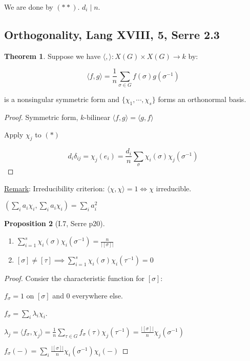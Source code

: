 \documentclass{article}
\theoremstyle{definition}
\newtheorem{theorem}{Theorem}
\newtheorem{proposition}[theorem]{Proposition}
\begin{document}
We are done by \((\ast\ast)\). \(d_i\mid n\). 

\subsection*{Orthogonality, Lang XVIII, 5, Serre 2.3}

\begin{theorem}
    Suppose we have \(\langle , \rangle : X(G) \times X(G) \to k\) by:

    \[
        \langle f,g \rangle = \frac{1}{n}\sum_{\sigma \in G} f(\sigma) g (\sigma ^{-1})
    \]

    is a nonsingular symmetric form and \(\{ \chi_1, \cdots , \chi_s \}\) forms an orthonormal basis.
\end{theorem}

\begin{proof}
    Symmetric form, \(k\)-bilinear \(\langle f,g \rangle = \langle g,f \rangle \) 

    Apply \(\chi_j\) to \((\ast)\)
    
    \[
        d_i \delta_{ij} = \chi_j(e_i) = \frac{d_i}{n} \sum_{\sigma} \chi_i(\sigma) \chi_j(\sigma ^{-1})
    \]
\end{proof}

\underline{Remark}: Irreducibility criterion: \(\langle \chi , \chi  \rangle = 1 \iff \chi\) irreducible.

\((\sum_{i} a_i \chi_i, \sum_{i} a_i \chi_i) = \sum_{i} a_i^2\) 


\begin{proposition}
    [I.7, Serre p20]

    \begin{enumerate}[label=\alph*)]
        \item \(\sum_{i=1}^{s} \chi_i (\sigma) \chi_i(\sigma^{-1}) = \frac{n}{\vert [\sigma] \vert } \)
        \item \([\sigma] \neq [\tau] \implies \sum_{i=1}^s \chi_i(\sigma) \chi_i(\tau ^{-1}) = 0 \)   
    \end{enumerate} 
\end{proposition}

\begin{proof}
    Consier the characteristic function for \([\sigma]\):

    \(f_\sigma = 1\) on \([\sigma]\) and \(0\) everywhere else. 

    \(f_\sigma = \sum_{i} \lambda_i \chi_i\).

    \(\lambda_j = \langle f_\sigma, \chi_j \rangle = \frac{1}{n} \sum_{\tau \in G} f_\sigma (\tau) \chi_j (\tau ^{-1}) = \frac{\vert [\sigma] \vert}{n} \chi_j (\sigma ^{-1})\) 

    \(f_\sigma (-) = \sum_{i} \frac{\vert [\sigma] \vert }{n} \chi_i(\sigma ^{-1} ) \chi_i(-)\) 
\end{proof}
\end{document}
